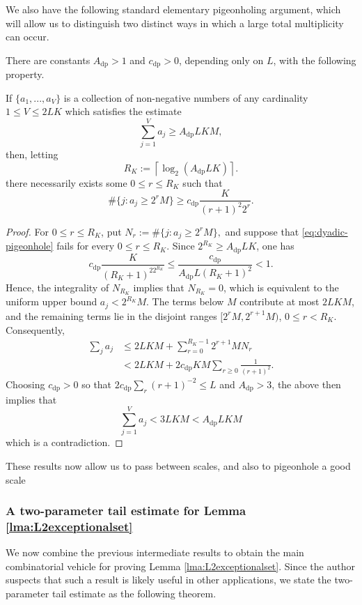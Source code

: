 \documentclass[12pt]{amsart}
\numberwithin{equation}{section}
\begin{document}
We also have the following standard elementary pigeonholing argument, which will allow us to distinguish two distinct ways in which a large total multiplicity can occur.

\begin{lemma}\label{lem:dyadic-pigeonhole}
There are constants $A_{\mathrm{dp}}>1$ and $c_{\mathrm{dp}}>0$, depending only on $L$, with the following property.

If $\{a_1,...,a_V\}$ is a collection of non-negative numbers of any cardinality $1 \leq V \leq 2LK$ which satisfies the estimate
\[
 \sum_{j=1}^{V} a_j\geq A_{\mathrm{dp}}LKM,
\]
then, letting
\[
 R_K:=\left\lceil\log_2(A_{\mathrm{dp}}LK)\right\rceil.
\]
there necessarily exists some $0\leq r\leq R_K$ such that
\begin{equation}\label{eq:dyadic-pigeonhole}
 \#\{j:a_j\geq2^rM\}
 \geq c_{\mathrm{dp}}\frac{K}{(r+1)^2 2^r}.
\end{equation}
\end{lemma}


\begin{proof}
For $0\leq r\leq R_K$, put
$
N_r:=\#\{j:a_j\geq2^rM\},
$
and suppose that \eqref{eq:dyadic-pigeonhole} fails for every $0 \leq r \leq R_K$.  Since
$2^{R_K}\geq A_{\mathrm{dp}}LK$, one has
\[
 c_{\mathrm{dp}}\frac{K}{(R_K+1)^22^{R_K}}
 \leq\frac{c_{\mathrm{dp}}}{A_{\mathrm{dp}}L(R_K+1)^2}<1.
\]
Hence, the integrality of $N_{R_K}$ implies that
$N_{R_K}=0$, which is equivalent to the uniform upper bound $a_j<2^{R_K}M$.  The terms below $M$ contribute at
most $2LKM$, and the remaining terms lie in the disjoint ranges
$[2^rM,2^{r+1}M)$, $0\leq r<R_K$.  Consequently,
\begin{align*}
 \sum_j a_j
 &\leq2LKM
   +\sum_{r=0}^{R_K-1}2^{r+1}M
     N_r\\
 &<2LKM+2c_{\mathrm{dp}}KM\sum_{r\geq0}\frac1{(r+1)^2}.
\end{align*}
Choosing $c_{\mathrm{dp}}>0$ so that
$2c_{\mathrm{dp}}\sum_{r}(r+1)^{-2}\leq L$ and
$A_{\mathrm{dp}}>3$, the above then implies that
$$
\sum_{j=1}^{V} a_j<3LKM<A_{\mathrm{dp}}LKM
$$
which is a contradiction.
\end{proof}

These results now allow us to pass between scales, and also to pigeonhole a good scale 

\subsubsection{A two-parameter tail estimate for Lemma \ref{lma:L2exceptionalset}}\label{subsubsec:twoparametertail}
We now combine the previous intermediate results to obtain the main combinatorial vehicle for proving Lemma \ref{lma:L2exceptionalset}. Since the author suspects that such a result is likely useful in other applications, we state the two-parameter tail estimate as the following theorem.
\end{document}
